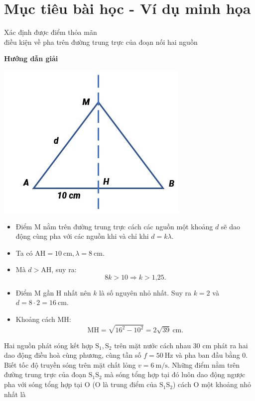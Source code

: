 \section{Mục tiêu bài học - Ví dụ minh họa}
\begin{dang}{Xác định được điểm thỏa mãn\\ điều kiện về pha trên đường trung trực của đoạn nối hai nguồn}
	{
		\begin{center}
			\textbf{Hướng dẫn giải}
			
			\vspace*{1em}
			\includegraphics[scale=0.7]{../figs/VN12-PH-11-A-007-3-V2-2.JPG}
		\end{center}
		
		\begin{itemize}
			\item Điểm M nằm trên đường trung trực cách các nguồn một khoảng $d$ sẽ dao động cùng pha với các nguồn khi và chỉ khi $d=k\lambda$.
			\item Ta có $\text{AH} = 10\ \text{cm}, \lambda = 8\ \text{cm}$.
			\item Mà $d> \text{AH}$, suy ra:
			\begin{equation*} 
				8k >10 \Rightarrow k > \text{1,25}.
			\end{equation*}
			\item Điểm M gần H nhất nên $k$ là số nguyên nhỏ nhất. Suy ra $k=2$ và $d= 8 \cdot 2 =16\ \text{cm}$.
			\item Khoảng cách MH:
			\begin{equation*} 
				\text{MH}=\sqrt {16^2 -10^2} =2\sqrt {39} \ \text{cm}.
			\end{equation*}
		\end{itemize}
	}
	{Hai nguồn phát sóng kết hợp $\text{S}_1, \text{S}_2$ trên mặt nước cách nhau 30 cm phát ra hai dao động điều hoà cùng phương, cùng tần số $f = 50\ \text{Hz}$ và pha ban đầu bằng 0. Biết tốc độ truyền sóng trên mặt chất lỏng $v = 6\ \text{m/s}$. Những điểm nằm trên đường trung trực của đoạn $\text{S}_1 \text{S}_2$ mà sóng tổng hợp tại đó luôn dao động ngược pha với sóng tổng hợp tại O (O là trung điểm của $\text{S}_1 \text{S}_2$) cách O một khoảng nhỏ nhất là
		
}
\end{dang}
